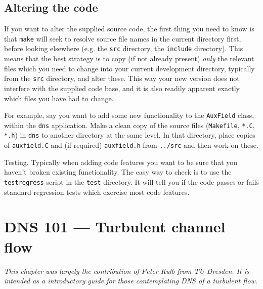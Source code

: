 \documentclass[11pt,a4paper]{report}
\begin{document}
\section{Altering the code}
\label{sec.alt}

If you want to alter the supplied source code, the first thing you
need to know is that \texttt{make} will seek to resolve source file
names in the current directory first, before looking elsewhere
(e.g. the \texttt{src} directory, the \texttt{include} directory).
This means that the best strategy is to copy (if not already present)
\emph{only} the relevant files which you need to change into your
current development directory, typically from the \texttt{src}
directory, and alter these. This way your new version does not
interfere with the supplied code base, and it is also readily apparent
exactly which files you have had to change.

For example, say you want to add some new functionality to the
\texttt{AuxField} class, within the \texttt{dns} application. Make a
clean copy of the source files (\texttt{Makefile}, \texttt{*.C},
\texttt{*.h}) in \texttt{dns} to another directory at the same
level. In that directory, place copies of \texttt{auxfield.C} and (if
required) \texttt{auxfield.h} from \texttt{../src} and then work on
these.

Testing.  Typically when adding code features you want to be sure that
you haven't broken existing functionality.  The easy way to check is
to use the \verb|testregress| script in the \verb|test| directory. It
will tell you if the code passes or fails standard regression tests
which exercise most code features.




\chapter{DNS 101 --- Turbulent channel flow}

\textsl{This chapter was largely the contribution of Peter Kulb from
  TU-Dresden.  It is intended as a introductory guide for those
  contemplating DNS of a turbulent flow.}\\
\end{document}
